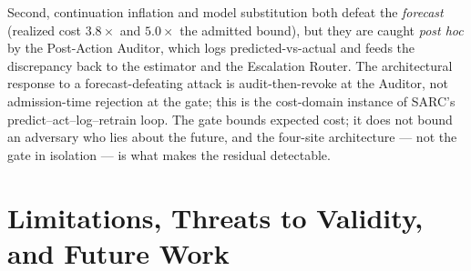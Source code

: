 \documentclass[11pt]{article}
\theoremstyle{plain}
\theoremstyle{definition}
\theoremstyle{remark}
\begin{document}
Second, continuation inflation and model substitution both defeat the \emph{forecast} (realized cost $3.8\times$ and $5.0\times$ the admitted bound), but they are caught \emph{post hoc} by the Post-Action Auditor, which logs predicted-vs-actual and feeds the discrepancy back to the estimator and the Escalation Router. The architectural response to a forecast-defeating attack is audit-then-revoke at the Auditor, not admission-time rejection at the gate; this is the cost-domain instance of SARC's predict--act--log--retrain loop. The gate bounds expected cost; it does not bound an adversary who lies about the future, and the four-site architecture --- not the gate in isolation --- is what makes the residual detectable.

\section{Limitations, Threats to Validity, and Future Work}\label{sec:limits}
\end{document}
